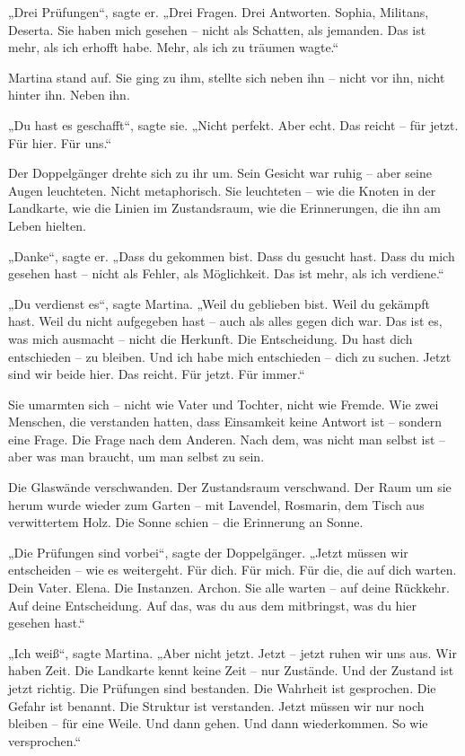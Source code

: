 \documentclass[
]{article}
\begin{document}
„Drei Prüfungen``, sagte er. „Drei Fragen. Drei Antworten. Sophia, Militans, Deserta. Sie haben mich gesehen -- nicht als Schatten, als jemanden. Das ist mehr, als ich erhofft habe. Mehr, als ich zu träumen wagte.``

Martina stand auf. Sie ging zu ihm, stellte sich neben ihn -- nicht vor ihn, nicht hinter ihn. Neben ihn.

„Du hast es geschafft``, sagte sie. „Nicht perfekt. Aber echt. Das reicht -- für jetzt. Für hier. Für uns.``

Der Doppelgänger drehte sich zu ihr um. Sein Gesicht war ruhig -- aber seine Augen leuchteten. Nicht metaphorisch. Sie leuchteten -- wie die Knoten in der Landkarte, wie die Linien im Zustandsraum, wie die Erinnerungen, die ihn am Leben hielten.

„Danke``, sagte er. „Dass du gekommen bist. Dass du gesucht hast. Dass du mich gesehen hast -- nicht als Fehler, als Möglichkeit. Das ist mehr, als ich verdiene.``

„Du verdienst es``, sagte Martina. „Weil du geblieben bist. Weil du gekämpft hast. Weil du nicht aufgegeben hast -- auch als alles gegen dich war. Das ist es, was mich ausmacht -- nicht die Herkunft. Die Entscheidung. Du hast dich entschieden -- zu bleiben. Und ich habe mich entschieden -- dich zu suchen. Jetzt sind wir beide hier. Das reicht. Für jetzt. Für immer.``

Sie umarmten sich -- nicht wie Vater und Tochter, nicht wie Fremde. Wie zwei Menschen, die verstanden hatten, dass Einsamkeit keine Antwort ist -- sondern eine Frage. Die Frage nach dem Anderen. Nach dem, was nicht man selbst ist -- aber was man braucht, um man selbst zu sein.

Die Glaswände verschwanden. Der Zustandsraum verschwand. Der Raum um sie herum wurde wieder zum Garten -- mit Lavendel, Rosmarin, dem Tisch aus verwittertem Holz. Die Sonne schien -- die Erinnerung an Sonne.

„Die Prüfungen sind vorbei``, sagte der Doppelgänger. „Jetzt müssen wir entscheiden -- wie es weitergeht. Für dich. Für mich. Für die, die auf dich warten. Dein Vater. Elena. Die Instanzen. Archon. Sie alle warten -- auf deine Rückkehr. Auf deine Entscheidung. Auf das, was du aus dem mitbringst, was du hier gesehen hast.``

„Ich weiß``, sagte Martina. „Aber nicht jetzt. Jetzt -- jetzt ruhen wir uns aus. Wir haben Zeit. Die Landkarte kennt keine Zeit -- nur Zustände. Und der Zustand ist jetzt richtig. Die Prüfungen sind bestanden. Die Wahrheit ist gesprochen. Die Gefahr ist benannt. Die Struktur ist verstanden. Jetzt müssen wir nur noch bleiben -- für eine Weile. Und dann gehen. Und dann wiederkommen. So wie versprochen.``
\end{document}
